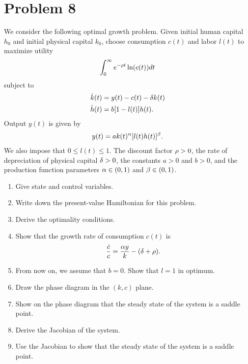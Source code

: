 \documentclass[letterpaper, 11pt, leqno]{article}
\begin{document}
\section*{Problem 8}

We consider the following optimal growth problem. Given initial human capital $h_{0}$ and initial physical capital $k_{0}$, choose consumption $c(t)$ and labor $l(t) $ to maximize utility
\begin{equation*}
\int_{0}^{\infty}e^{-\r t} \ln{c(t)} dt
\end{equation*}
subject to
\begin{align*}
\dot{k}(t) &=y(t)-c(t)-\delta k(t) \\
\dot{h}(t) &=b [1-l(t)] h(t).
\end{align*}
Output $y(t)$ is given by
\begin{equation*}
y(t) = a k(t)^{\alpha} [l(t) h(t)]^{\beta}.
\end{equation*}
We also impose that $0 \le l(t)\le 1$. The discount factor $\rho>0$, the rate of depreciation of physical capital $\delta>0$, the constants $a>0$ and $b>0$, and the production function parameters $\alpha\in (0,1)$ and $\beta \in(0,1)$.

\begin{enumerate}
\item Give state and control variables.
\item Write down the present-value Hamiltonian for this problem.
\item Derive the optimality conditions. 
\item Show that the growth rate of consumption $c(t)$ is
\begin{equation*}
\frac{\dot{c}}{c}=\frac{\alpha y}{k}-(\delta +\rho).
\end{equation*}
\item From now on, we assume that $b=0$. Show that $l=1$ in optimum.
\item Draw the phase diagram in the $(k,c)$ plane.
\item Show on the phase diagram that the steady state of the system is a saddle point.
\item Derive the Jacobian of the system.
\item Use the Jacobian to show that the steady state of the system is a saddle point.
\end{enumerate}
\end{document}
